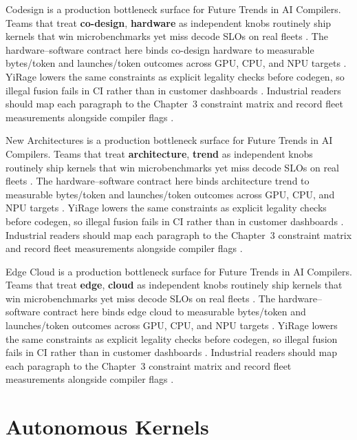 Codesign is a production bottleneck surface for Future Trends in AI Compilers. Teams that treat \textbf{co-design}, \textbf{hardware} as independent knobs routinely ship kernels that win microbenchmarks yet miss decode SLOs on real fleets \citep{patel2025llminference,nvidia2022hopper}. The hardware--software contract here binds co-design hardware to measurable bytes/token and launches/token outcomes across GPU, CPU, and NPU targets \citep{taxbreak2026,semianalysis2024tma}. YiRage lowers the same constraints as explicit legality checks before codegen, so illegal fusion fails in CI rather than in customer dashboards \citep{memoryfloor2026,amd2024xdna}. Industrial readers should map each paragraph to the Chapter~3 constraint matrix and record fleet measurements alongside compiler flags \citep{nvidia2022hopper,amd2024aie}.

New Architectures is a production bottleneck surface for Future Trends in AI Compilers. Teams that treat \textbf{architecture}, \textbf{trend} as independent knobs routinely ship kernels that win microbenchmarks yet miss decode SLOs on real fleets \citep{taxbreak2026,semianalysis2024tma}. The hardware--software contract here binds architecture trend to measurable bytes/token and launches/token outcomes across GPU, CPU, and NPU targets \citep{memoryfloor2026,amd2024xdna}. YiRage lowers the same constraints as explicit legality checks before codegen, so illegal fusion fails in CI rather than in customer dashboards \citep{nvidia2022hopper,amd2024aie}. Industrial readers should map each paragraph to the Chapter~3 constraint matrix and record fleet measurements alongside compiler flags \citep{semianalysis2024tma,dlbook}.

Edge Cloud is a production bottleneck surface for Future Trends in AI Compilers. Teams that treat \textbf{edge}, \textbf{cloud} as independent knobs routinely ship kernels that win microbenchmarks yet miss decode SLOs on real fleets \citep{memoryfloor2026,amd2024xdna}. The hardware--software contract here binds edge cloud to measurable bytes/token and launches/token outcomes across GPU, CPU, and NPU targets \citep{nvidia2022hopper,amd2024aie}. YiRage lowers the same constraints as explicit legality checks before codegen, so illegal fusion fails in CI rather than in customer dashboards \citep{semianalysis2024tma,dlbook}. Industrial readers should map each paragraph to the Chapter~3 constraint matrix and record fleet measurements alongside compiler flags \citep{amd2024xdna,dao2022flashattention}.

\section{Autonomous Kernels}
\label{sec:autonomous_kernels}

